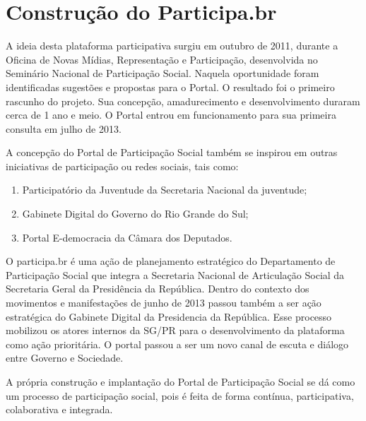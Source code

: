 \documentclass{article}
\begin{document}
\section{Construção do Participa.br}

%
%

A ideia desta plataforma participativa surgiu em outubro de 2011, durante a
Oficina de Novas Mídias, Representação e Participação, desenvolvida no
Seminário Nacional de Participação Social. Naquela oportunidade foram
identificadas sugestões e propostas para o Portal. O resultado foi o primeiro
rascunho do projeto. Sua concepção, amadurecimento e desenvolvimento duraram
cerca de 1 ano e meio. O Portal entrou em funcionamento para sua primeira
consulta em julho de 2013.

A concepção do Portal de Participação Social também se inspirou em outras
iniciativas de participação ou redes sociais, tais como: 

\begin{enumerate} %
  \item Participatório da Juventude da Secretaria Nacional da juventude;
  \item Gabinete Digital do Governo do Rio Grande do Sul;
  \item Portal E-democracia da Câmara dos Deputados.
\end{enumerate}

O participa.br é uma ação de planejamento estratégico do Departamento de
Participação Social que integra a Secretaria Nacional de Articulação Social da
Secretaria Geral da Presidência da República. Dentro do contexto dos movimentos
e manifestações de junho de 2013 passou também a ser ação estratégica do
Gabinete Digital da Presidencia da República. Esse processo mobilizou os atores
internos da SG/PR para o desenvolvimento da plataforma como ação prioritária. O
portal passou a ser um novo canal de escuta e diálogo entre Governo e
Sociedade.

A própria construção e implantação do Portal de Participação Social se dá como
um processo de participação social, pois é feita de forma contínua,
participativa, colaborativa e integrada. 
\end{document}
